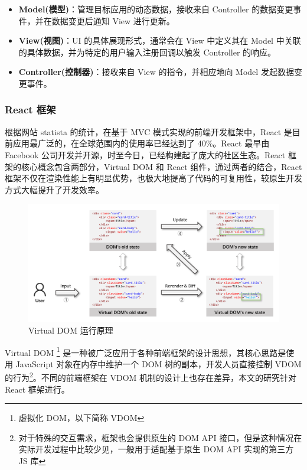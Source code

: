 \documentclass[winfonts,master,twoside]{njuthesis}
\begin{document}
\begin{itemize}
    \item \textbf{Model(模型)}：管理目标应用的动态数据，接收来自 Controller 的数据变更事件，并在数据变更后通知 View 进行更新。
    \item \textbf{View(视图)}：UI 的具体展现形式，通常会在 View 中定义其在 Model 中关联的具体数据，并为特定的用户输入注册回调以触发 Controller 的响应。
    \item \textbf{Controller(控制器)}：接收来自 View 的指令，并相应地向 Model 发起数据变更事件。
\end{itemize}

\subsubsection{React 框架}\label{react-framework}

根据网站 statista 的统计\cite{frontend-frameworks-market-share}，在基于 MVC 模式实现的前端开发框架中，React 是目前应用最广泛的，在全球范围内的使用率已经达到了 40\%。React 最早由 Facebook 公司开发并开源，时至今日，已经构建起了庞大的社区生态。React 框架的核心概念包含两部分，Virtual DOM 和 React 组件，通过两者的结合，React 框架不仅在渲染性能上有明显优势，也极大地提高了代码的可复用性，较原生开发方式大幅提升了开发效率。

\begin{figure}[h]
    \centering
    \includegraphics[width=\textwidth]{figure/chapter-2/VDOM-update.png}
    \caption{Virtual DOM 运行原理}
    \label{virtual-dom-runtime}
\end{figure}

Virtual DOM \footnote{虚拟化 DOM，以下简称 VDOM} 是一种被广泛应用于各种前端框架的设计思想\cite{virtual-dom}，其核心思路是使用 JavaScript 对象在内存中维护一个 DOM 树的副本，开发人员直接控制 VDOM 的行为\footnote{对于特殊的交互需求，框架也会提供原生的 DOM API 接口，但是这种情况在实际开发过程中比较少见，一般用于适配基于原生 DOM API 实现的第三方 JS 库}。不同的前端框架在 VDOM 机制的设计上也存在差异，本文的研究针对 React 框架进行。
\end{document}
